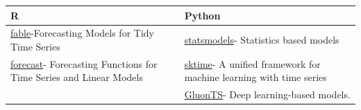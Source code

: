 \documentclass[]{book}
\begin{document}
\begin{longtable}[]{@{}ll@{}}
\toprule
\begin{minipage}[b]{0.47\columnwidth}\raggedright
R\strut
\end{minipage} & \begin{minipage}[b]{0.47\columnwidth}\raggedright
Python\strut
\end{minipage}\tabularnewline
\midrule
\endhead
\begin{minipage}[t]{0.47\columnwidth}\raggedright
\href{https://cran.r-project.org/web/packages/fable/index.html}{fable}-Forecasting Models for Tidy Time Series\strut
\end{minipage} & \begin{minipage}[t]{0.47\columnwidth}\raggedright
\href{https://www.statsmodels.org/devel/user-guide.html\#time-series-analysis}{statsmodels}- Statistics based models\strut
\end{minipage}\tabularnewline
\begin{minipage}[t]{0.47\columnwidth}\raggedright
\href{https://cran.r-project.org/web/packages/forecast/index.html}{forecast}- Forecasting Functions for Time Series and Linear Models\strut
\end{minipage} & \begin{minipage}[t]{0.47\columnwidth}\raggedright
\href{https://www.sktime.org/en/latest/}{sktime}- A unified framework for machine learning with time series\strut
\end{minipage}\tabularnewline
\begin{minipage}[t]{0.47\columnwidth}\raggedright
\(\text{}\)\strut
\end{minipage} & \begin{minipage}[t]{0.47\columnwidth}\raggedright
\href{https://ts.gluon.ai/}{GluonTS}- Deep learning-based models.\strut
\end{minipage}\tabularnewline
\bottomrule
\end{longtable}


\end{document}

